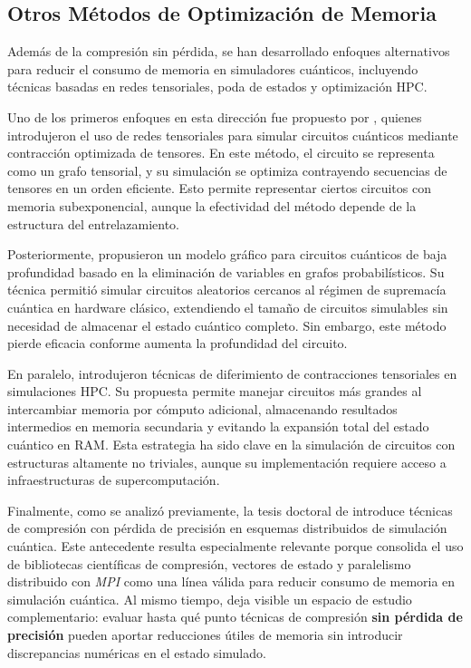 \subsection{Otros Métodos de Optimización de Memoria}
Además de la compresión sin pérdida, se han desarrollado enfoques alternativos
para reducir el consumo de memoria en simuladores cuánticos, incluyendo
técnicas basadas en redes tensoriales, poda de estados y optimización HPC.

Uno de los primeros enfoques en esta dirección fue propuesto por \textcite{Markov2008},
quienes introdujeron el uso de redes tensoriales para simular circuitos
cuánticos mediante contracción optimizada de tensores. En este método, el
circuito se representa como un grafo tensorial, y su simulación se optimiza contrayendo
secuencias de tensores en un orden eficiente. Esto permite representar ciertos
circuitos con memoria subexponencial, aunque la efectividad del método depende
de la estructura del entrelazamiento.

Posteriormente, \textcite{Boixo2018} propusieron un modelo gráfico para
circuitos cuánticos de baja profundidad basado en la eliminación de variables
en grafos probabilísticos. Su técnica permitió simular circuitos aleatorios cercanos
al régimen de supremacía cuántica en hardware clásico, extendiendo el tamaño
de circuitos simulables sin necesidad de almacenar el estado cuántico completo.
Sin embargo, este método pierde eficacia conforme aumenta la profundidad del
circuito.

En paralelo, \textcite{Pednault2017} introdujeron técnicas de diferimiento de contracciones
tensoriales en simulaciones HPC. Su propuesta permite manejar circuitos más
grandes al intercambiar memoria por cómputo adicional, almacenando resultados intermedios
en memoria secundaria y evitando la expansión total del estado cuántico en RAM.
Esta estrategia ha sido clave en la simulación de circuitos con estructuras
altamente no triviales, aunque su implementación requiere acceso a infraestructuras
de supercomputación.

Finalmente, como se analizó previamente, la tesis doctoral de \textcite{DiazToro2025}
introduce técnicas de compresión con pérdida de precisión en esquemas distribuidos
de simulación cuántica. Este antecedente resulta especialmente relevante porque
consolida el uso de bibliotecas científicas de compresión, vectores de estado y
paralelismo distribuido con \emph{MPI} como una línea válida para reducir consumo
de memoria en simulación cuántica. Al mismo tiempo, deja visible un espacio de
estudio complementario: evaluar hasta qué punto técnicas de compresión
\textbf{sin pérdida de precisión} pueden aportar reducciones útiles de memoria sin
introducir discrepancias numéricas en el estado simulado.
